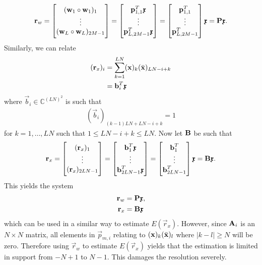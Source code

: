 \documentclass[a4paper, openany, oneside]{memoir}
\begin{document}
\begin{align*}
    \boldsymbol{\mathbf{r}}_w = \begin{bmatrix}
        (\boldsymbol{\mathbf{w}}_1 \circ \boldsymbol{\mathbf{w}}_1)_1 \\
        \vdots \\
        (\boldsymbol{\mathbf{w}}_L \circ \boldsymbol{\mathbf{w}}_L)_{2M-1}
    \end{bmatrix} = \begin{bmatrix}
        \boldsymbol{\mathbf{p}}_{1,1}^T \boldsymbol{\mathbf{\mathfrak{x}}} \\
        \vdots \\
        \boldsymbol{\mathbf{p}}_{L,2M-1}^T \boldsymbol{\mathbf{\mathfrak{x}}}
    \end{bmatrix} = \begin{bmatrix}
        \boldsymbol{\mathbf{p}}_{1,1}^T \\
        \vdots \\
        \boldsymbol{\mathbf{p}}_{L,2M-1}^T
    \end{bmatrix} \boldsymbol{\mathbf{\mathfrak{x}}} = \boldsymbol{\mathbf{P}} \boldsymbol{\mathbf{\mathfrak{x}}}.
\end{align*}
Similarly, we can relate
\begin{align*}
    (\boldsymbol{\mathbf{r}}_x)_i &= \sum_{k=1}^{LN}(\boldsymbol{\mathbf{x}})_k (\bar{\boldsymbol{\mathbf{x}}})_{LN-i+k} \\
    &= \boldsymbol{\mathbf{b}}_i^T \boldsymbol{\mathbf{\mathfrak{x}}}
\end{align*}
where $\vec{b}_i \in \mathbb{C}^{(LN)^2}$ is such that
\begin{align*}
    (\vec{b}_i)_{(k-1)LN+LN-i+k} = 1
\end{align*}
for $k = 1,\ldots,LN$ such that $1 \le LN-i+k \le LN$. Now let $\boldsymbol{\mathbf{B}}$ be such that
\begin{align*}
    \boldsymbol{\mathbf{r}}_x = \begin{bmatrix}
        (\boldsymbol{\mathbf{r}}_x)_1 \\
        \vdots \\
        (\boldsymbol{\mathbf{r}}_x)_{2LN-1}
    \end{bmatrix} = \begin{bmatrix}
        \boldsymbol{\mathbf{b}}_1^T \boldsymbol{\mathbf{\mathfrak{x}}} \\
        \vdots \\
        \boldsymbol{\mathbf{b}}_{2LN-1}^T \boldsymbol{\mathbf{\mathfrak{x}}}
    \end{bmatrix} = \begin{bmatrix}
        \boldsymbol{\mathbf{b}}_1^T \\
        \vdots \\
        \boldsymbol{\mathbf{b}}_{2LN-1}^T
    \end{bmatrix} \boldsymbol{\mathbf{\mathfrak{x}}} = \boldsymbol{\mathbf{B}} \boldsymbol{\mathbf{\mathfrak{x}}}.
\end{align*}
This yields the system
\begin{align*}
    \boldsymbol{\mathbf{r}}_w &= \boldsymbol{\mathbf{P}} \boldsymbol{\mathbf{\mathfrak{x}}}, \\
    \boldsymbol{\mathbf{r}}_x &= \boldsymbol{\mathbf{B}} \boldsymbol{\mathbf{\mathfrak{x}}}
\end{align*}
which can be used in a similar way to estimate $E(\vec{r}_x)$. However, since $\boldsymbol{\mathbf{A}}_i$ is an $N \times N$ matrix, all elements in $\vec{p}_{m,i}$ relating to $(\boldsymbol{\mathbf{x}})_k (\bar{\boldsymbol{\mathbf{x}}})_l$ where $|k - l| \ge N$ will be zero. Therefore using $\vec{r}_w$ to estimate $E(\vec{r}_x)$ yields that the estimation is limited in support from $-N+1$ to $N-1$. This damages the resolution severely.
\end{document}
